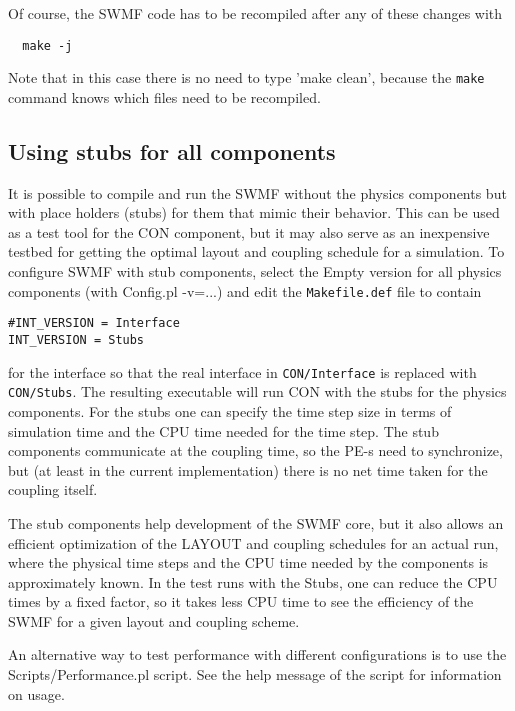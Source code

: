 Of course, the SWMF code has to be recompiled after any of these changes with
\begin{verbatim}
  make -j
\end{verbatim}
Note that in this case there is no need to type 'make clean', 
because the {\tt make} command knows which files need to be recompiled.

\subsection{Using stubs for all components}

It is possible to compile and run the SWMF without the physics components
but with place holders (stubs) for them that mimic their behavior.
This can be used as a test tool for the CON component, but it may
also serve as an inexpensive testbed for getting the optimal layout
and coupling schedule for a simulation. To configure SWMF with 
stub components, select the Empty version for all physics components
(with Config.pl -v=...) and edit the {\tt Makefile.def} file to
contain
\begin{verbatim}
#INT_VERSION = Interface
INT_VERSION = Stubs
\end{verbatim}
for the interface so that the real interface in {\tt CON/Interface}
is replaced with {\tt CON/Stubs}.
The resulting executable will run CON with 
the stubs for the physics components. For the stubs one can
specify the time step size in terms of simulation time and the
CPU time needed for the time step. The stub components communicate
at the coupling time, so the PE-s need to synchronize, but 
(at least in the current implementation) there is no net time taken
for the coupling itself. 

The stub components help development of the SWMF core, but it also
allows an efficient optimization of the LAYOUT and coupling
schedules for an actual run, where the physical time steps
and the CPU time needed by the components is approximately known.
In the test runs with the Stubs, one can reduce the CPU times by 
a fixed factor, so it takes less CPU time to see the efficiency of the 
SWMF for a given layout and coupling scheme.

An alternative way to test performance with different configurations is
to use the Scripts/Performance.pl script. See the help message of the
script for information on usage.

